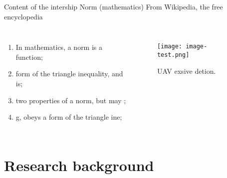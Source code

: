 \documentclass[table,aspectratio=1610]{beamer}%
\begin{document}
\begin{frame}{Content of the intership}	
	Norm (mathematics) From Wikipedia, the free encyclopedia 

	\begin{columns}
			\begin{enumerate}[<+->]
				\item In mathematics, a norm is a \alert{function};
				
				\item  form of the triangle \alert{inequality}, and is;
				
				\item two properties of a norm, but may ;
				
				\item g, obeys a form of the triangle ine;
			\end{enumerate}
		
			\begin{figure}
				\centering
				\texttt{[image: image-test.png]}
				\caption{\alert{UAV} exsive detion.}
			\end{figure}
	\end{columns}
		
\end{frame}

\section{Research background}
\end{document}
